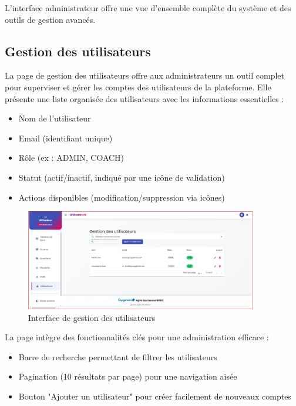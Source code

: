 \documentclass[12pt,a4paper]{report}
\begin{document}
L'interface administrateur offre une vue d'ensemble complète du système et des outils de gestion avancés.

\subsection{Gestion des utilisateurs}

La page de gestion des utilisateurs offre aux administrateurs un outil complet pour superviser et gérer les comptes des utilisateurs de la plateforme. Elle présente une liste organisée des utilisateurs avec les informations essentielles :

\begin{itemize}
    \item Nom de l'utilisateur
    \item Email (identifiant unique)
    \item Rôle (ex : ADMIN, COACH)
    \item Statut (actif/inactif, indiqué par une icône de validation)
    \item Actions disponibles (modification/suppression via icônes)
\end{itemize}

\begin{figure}[H]
\centering
\includegraphics[width=0.9\textwidth]{latex_media/media/image53.png}
\caption{Interface de gestion des utilisateurs}
\label{fig:gestion-utilisateurs}
\end{figure}

La page intègre des fonctionnalités clés pour une administration efficace :

\begin{itemize}
    \item Barre de recherche permettant de filtrer les utilisateurs
    \item Pagination (10 résultats par page) pour une navigation aisée
    \item Bouton "Ajouter un utilisateur" pour créer facilement de nouveaux comptes
\end{itemize}
\end{document}
